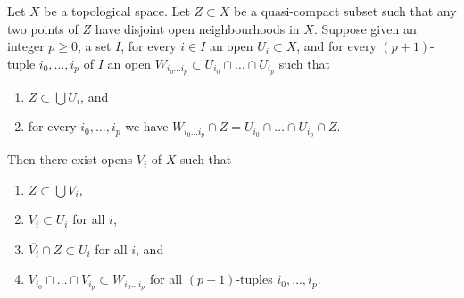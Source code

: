 \begin{lemma}
\label{lemma-lift-covering-of-quasi-compact-hausdorff-subset}
Let $X$ be a topological space. Let $Z \subset X$ be a quasi-compact subset
such that any two points of $Z$ have disjoint open neighbourhoods in $X$.
Suppose given an integer $p \geq 0$, a set $I$, for every $i \in I$
an open $U_i \subset X$, and for every $(p + 1)$-tuple
$i_0, \ldots, i_p$ of $I$ an open
$W_{i_0 \ldots i_p} \subset U_{i_0} \cap \ldots \cap U_{i_p}$
such that
\begin{enumerate}
\item $Z \subset \bigcup U_i$, and
\item for every $i_0, \ldots, i_p$ we have
$W_{i_0 \ldots i_p} \cap Z = U_{i_0} \cap \ldots \cap U_{i_p} \cap Z$.
\end{enumerate}
Then there exist opens $V_i$ of $X$ such that
\begin{enumerate}
\item $Z \subset \bigcup V_i$,
\item $V_i \subset U_i$ for all $i$,
\item $\overline{V_i} \cap Z \subset U_i$ for all $i$, and
\item $V_{i_0} \cap \ldots \cap V_{i_p} \subset W_{i_0 \ldots i_p}$
for all $(p + 1)$-tuples $i_0, \ldots, i_p$.
\end{enumerate}
\end{lemma}

